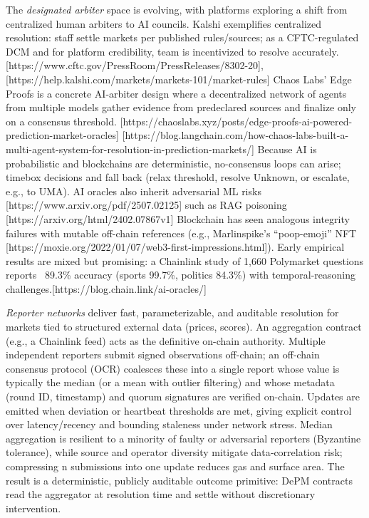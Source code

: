 The \textit{designated arbiter} space is evolving, with platforms exploring a shift from centralized human arbiters to AI councils. Kalshi exemplifies centralized resolution: staff settle markets per published rules/sources; as a CFTC-regulated DCM and for platform credibility, team is incentivized to resolve accurately.[https://www.cftc.gov/PressRoom/PressReleases/8302-20], [https://help.kalshi.com/markets/markets-101/market-rules]
Chaos Labs’ Edge Proofs is a concrete AI-arbiter design where a decentralized network of agents from multiple models gather evidence from predeclared sources and finalize only on a consensus threshold. [https://chaoslabs.xyz/posts/edge-proofs-ai-powered-prediction-market-oracles] [https://blog.langchain.com/how-chaos-labs-built-a-multi-agent-system-for-resolution-in-prediction-markets/]
Because AI is probabilistic and blockchains are deterministic, no-consensus loops can arise; timebox decisions and fall back (relax threshold, resolve Unknown, or escalate, e.g., to UMA). AI oracles also inherit adversarial ML risks [https://www.arxiv.org/pdf/2507.02125] such as RAG poisoning [https://arxiv.org/html/2402.07867v1] Blockchain has seen analogous integrity failures with mutable off-chain references (e.g., Marlinspike’s “poop-emoji” NFT [https://moxie.org/2022/01/07/web3-first-impressions.html]).
Early empirical results are mixed but promising: a Chainlink study of 1,660 Polymarket questions reports ~89.3\% accuracy (sports 99.7\%, politics 84.3\%) with temporal-reasoning challenges.[https://blog.chain.link/ai-oracles/]





\textit{Reporter networks} deliver fast, parameterizable, and auditable resolution for markets tied to structured external data (prices, scores). An aggregation contract (e.g., a Chainlink feed) acts as the definitive on-chain authority. Multiple independent reporters submit signed observations off-chain; an off‑chain consensus protocol (OCR) coalesces these into a single report whose value is typically the median (or a mean with outlier filtering) and whose metadata (round ID, timestamp) and quorum signatures are verified on-chain. Updates are emitted when deviation or heartbeat thresholds are met, giving explicit control over latency/recency and bounding staleness under network stress. Median aggregation is resilient to a minority of faulty or adversarial reporters (Byzantine tolerance), while source and operator diversity mitigate data‑correlation risk; compressing n submissions into one update reduces gas and surface area. The result is a deterministic, publicly auditable outcome primitive: DePM contracts read the aggregator at resolution time and settle without discretionary intervention.

